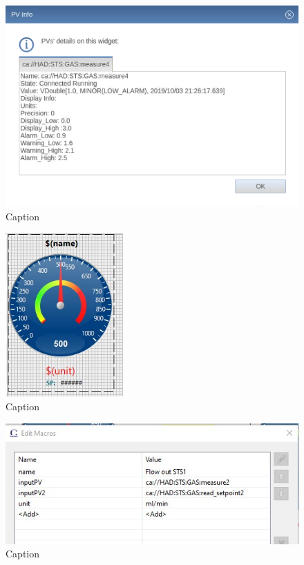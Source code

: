 \begin{figure}
    \centering
    \includegraphics[width=1\textwidth]{images/Minoralarm.PNG}
    \caption{Caption}
    \label{fig:my_label}
\end{figure}
\begin{figure}
    \centering
    \includegraphics[width=0.4\textwidth]{images/linkcontainer.jpg}
    \caption{Caption}
    \label{fig:my_label}
\end{figure}
\begin{figure}
    \centering
    \includegraphics[width=1.0\textwidth]{images/linkcontainer2.jpg}
    \caption{Caption}
    \label{fig:my_label}
\end{figure}
